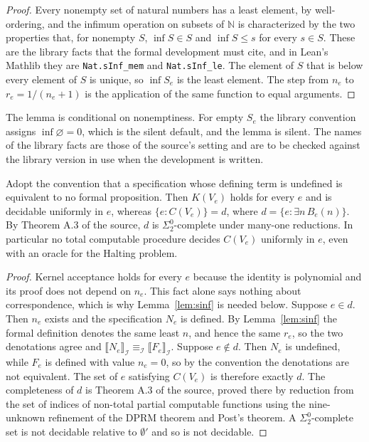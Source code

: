 \begin{proof}
Every nonempty set of natural numbers has a least element, by well-ordering, and the infimum operation on subsets of $\mathbb{N}$ is characterized by the two properties that, for nonempty $S$, $\inf S \in S$ and $\inf S \le s$ for every $s \in S$. These are the library facts that the formal development must cite, and in Lean's Mathlib they are \texttt{Nat.sInf\_mem} and \texttt{Nat.sInf\_le}. The element of $S$ that is below every element of $S$ is unique, so $\inf S_e$ is the least element. The step from $n_e$ to $r_e = 1/(n_e+1)$ is the application of the same function to equal arguments.
\end{proof}

The lemma is conditional on nonemptiness. For empty $S_e$ the library convention assigns $\inf \varnothing = 0$, which is the silent default, and the lemma is silent. The names of the library facts are those of the source's setting and are to be checked against the library version in use when the development is written.

\begin{theorem}
\label{thm:hidden}
Adopt the convention that a specification whose defining term is undefined is equivalent to no formal proposition. Then $K(V_e)$ holds for every $e$ and is decidable uniformly in $e$, whereas $\{e : C(V_e)\} = d$, where $d = \{e : \exists n\, B_e(n)\}$. By Theorem A.3 of the source, $d$ is $\Sigma^0_2$-complete under many-one reductions. In particular no total computable procedure decides $C(V_e)$ uniformly in $e$, even with an oracle for the Halting problem.
\end{theorem}

\begin{proof}
Kernel acceptance holds for every $e$ because the identity is polynomial and its proof does not depend on $n_e$. This fact alone says nothing about correspondence, which is why Lemma~\ref{lem:sinf} is needed below. Suppose $e \in d$. Then $n_e$ exists and the specification $N_e$ is defined. By Lemma~\ref{lem:sinf} the formal definition denotes the same least $n$, and hence the same $r_e$, so the two denotations agree and $\llbracket N_e \rrbracket_{\mathcal{I}} \equiv_{\mathcal{I}} \llbracket F_e \rrbracket_{\mathcal{I}}$. Suppose $e \notin d$. Then $N_e$ is undefined, while $F_e$ is defined with value $n_e = 0$, so by the convention the denotations are not equivalent. The set of $e$ satisfying $C(V_e)$ is therefore exactly $d$. The completeness of $d$ is Theorem A.3 of the source, proved there by reduction from the set of indices of non-total partial computable functions using the nine-unknown refinement of the DPRM theorem and Post's theorem. A $\Sigma^0_2$-complete set is not decidable relative to $\emptyset'$ and so is not decidable.
\end{proof}

